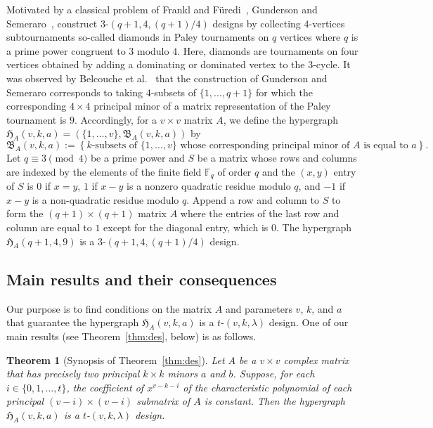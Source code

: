 \documentclass[11pt]{article}
\newtheorem{theorem}{Theorem}[section]
\begin{document}
Motivated by a classical problem of Frankl and F\"{u}redi~\cite{FF}, Gunderson and Semeraro~\cite[Theorem~11]{GunSem}, 
construct $3$-$(q+1,4,(q+1)/4)$ designs by collecting $4$-vertices subtournaments so-called diamonds in Paley tournaments on $q$ vertices where $q$ is a prime power congruent to $3$ modulo $4$. 
Here, diamonds are tournaments on four vertices obtained by adding a dominating or dominated vertex to the $3$-cycle.  
\textbf{}
It was observed by Belcouche et al.~\cite{BBLZ} that the construction of Gunderson and Semeraro corresponds to taking $4$-subsets of $\{1,\dots,q+1\}$ for which the corresponding $4 \times 4$ principal minor of a matrix representation of the Paley tournament is $9$.
Accordingly, for a $v\times v$ matrix $A$, we define the hypergraph $\mathfrak H_A(v,k,a)=(\{1,\dots,v\},\mathfrak B_A(v,k,a))$ by 
    \[\mathfrak B_A(v,k,a) :=\left\{k\text{-subsets of }\{1,\dots,v\}\text{ whose corresponding principal minor of } A \text{ is equal to } a    \right\}.\]
Let $q\equiv3\pmod{4}$ be a prime power and $S$ be a matrix whose rows and columns are indexed by the elements of the finite field $\mathbb{F}_q$ of order $q$ and the $(x,y)$ entry of $S$ is $0$ if $x=y$, $1$ if $x-y$ is a nonzero quadratic residue modulo $q$, and $-1$ if $x-y$ is a non-quadratic residue modulo $q$.
Append a row and column to $S$ to form the $(q+1) \times (q+1)$ matrix $A$ where the entries of the last row and column are equal to $1$ except for the diagonal entry, which is $0$.
The hypergraph $\mathfrak H_{A}(q+1,4,9)$ is a $3$-$(q+1,4,(q+1)/4)$ design.

\subsection{Main results and their consequences}

Our purpose is to find conditions on the matrix $A$ and parameters $v$, $k$, and $a$ that guarantee the hypergraph $\mathfrak H_{A}(v,k,a)$ is a $t$-$(v,k,\lambda)$ design.
One of our main results (see Theorem~\ref{thm:des}, below) is as follows.
\begin{theorem}[Synopsis of Theorem~\ref{thm:des}]
\label{thm:main1}
    Let $A$ be a $v \times v$ complex matrix that has precisely two principal $k \times k$ minors $a$ and $b$.
    Suppose, for each $i \in \{0,1,\dots,t\}$, the coefficient of $x^{v-k-i}$ of the characteristic polynomial of each principal $(v-i) \times (v-i)$ submatrix of $A$ is constant.
    Then the hypergraph $\mathfrak H_A(v,k,a)$ is a $t$-$(v,k,\lambda)$ design. 
\end{theorem}
 
\end{document}
